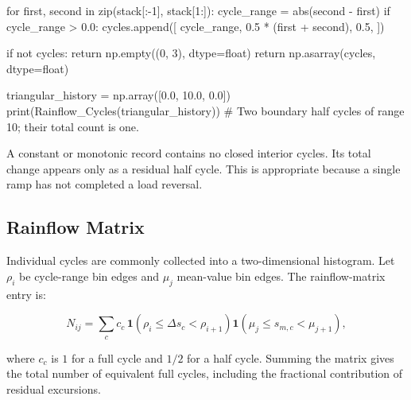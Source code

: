 \begin{python}
    for first, second in zip(stack[:-1], stack[1:]):
        cycle_range = abs(second - first)
        if cycle_range > 0.0:
            cycles.append([
                cycle_range,
                0.5 * (first + second),
                0.5,
            ])

    if not cycles:
        return np.empty((0, 3), dtype=float)
    return np.asarray(cycles, dtype=float)


triangular_history = np.array([0.0, 10.0, 0.0])
print(Rainflow_Cycles(triangular_history))
# Two boundary half cycles of range 10; their total count is one.
\end{python}

A constant or monotonic record contains no closed interior cycles. Its total
change appears only as a residual half cycle. This is appropriate because a
single ramp has not completed a load reversal.

\subsection{Rainflow Matrix}

Individual cycles are commonly collected into a two-dimensional histogram. Let
$\rho_i$ be cycle-range bin edges and $\mu_j$ mean-value bin edges. The
rainflow-matrix entry is:

\begin{equation}\label{rainflow-matrix-definition}
    N_{ij}
    =
    \sum_c
    c_c\,
    \mathbf{1}\!\left(\rho_i\leq\Delta s_c<\rho_{i+1}\right)
    \mathbf{1}\!\left(\mu_j\leq s_{m,c}<\mu_{j+1}\right),
\end{equation}

where $c_c$ is $1$ for a full cycle and $1/2$ for a half cycle. Summing the
matrix gives the total number of equivalent full cycles, including the
fractional contribution of residual excursions.

